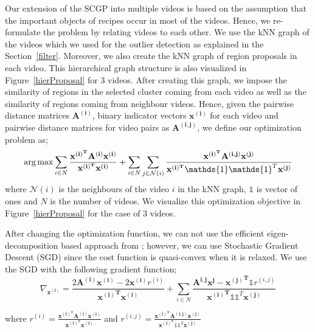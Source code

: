 Our extension of the SCGP into multiple videos is based on the assumption that the important objects of recipes occur in most of the videos. Hence, we re-formulate the problem by relating videos to each other. We use the kNN graph of the videos which we used for the outlier detection as explained in the Section~\ref{filter}. Moreover, we also create the kNN graph of region proposals in each video. This hierarchical graph structure is also visualized in Figure~\ref{hierProposal} for 3 videos. After creating this graph, we impose the similarity of regions in the selected cluster coming from each video as well as the similarity of regions coming from neighbour videos. Hence, given the pairwise distance matrices $\mathbf{A^{(i)}}$, binary indicator vectors $\mathbf{x^{(i)}}$ for each video and pairwise distance matrices for video pairs as $\mathbf{A^{(i,j)}}$, we define our optimization problem as;
\begin{equation}
\argmax \sum_{i \in N} \frac{\mathbf{x^{(i)^T}}\mathbf{A^{(i)}}\mathbf{x^{(i)}}}{\mathbf{x^{(i)^T}}\mathbf{x^{(i)}}} +
\sum_{i \in N} \sum_{j \in \mathcal{N}(i)} \frac{\mathbf{x^{(i)^T}}\mathbf{A^{(i,j)}}\mathbf{x^{(j)}}} {\mathbf{x^{(i)^T}}\mathds{1}\mathds{1}^T\mathbf{x^{(j)}}}
\end{equation}
where $\mathcal{N}(i)$ is the neighbours of the video $i$ in the kNN graph, $\mathds{1}$ is vector of ones and $N$ is the number of videos. We visualize this optimization objective in Figure~\ref{hierProposal} for the case of 3 videos.

After changing the optimization function, we can not use the efficient eigen-decomposition based approach from \cite{scgp,scgp_eigen}; however, we can use Stochastic Gradient Descent (SGD) since the cost function is quasi-convex when it is relaxed. We use the SGD with the following gradient function;
\begin{equation}
  \nabla_{\mathbf{x^{(i)}}} = \frac{2\mathbf{A^{(i)}} \mathbf{x^{(i)}} -2\mathbf{x^{(i)}} r^{(i)}}
  {\mathbf{{x^{(i)}}^T}\mathbf{x^{(i)}}}
+ \sum_{i \in N} \frac{\mathbf{A^{i,j}}\mathbf{x^{j}} - \mathbf{{x^{(j)}}^T} \mathds{1} r^{(i,j)}}{\mathbf{{x^{(i)}}^T} \mathds{1} \mathds{1}^T \mathbf{x^{(j)}} }
\end{equation}

where $r^{(i)}=\frac{\mathbf{x^{(i)^T}}\mathbf{A^{(i)}}\mathbf{x^{(i)}}}{\mathbf{x^{(i)^T}}\mathbf{x^{(i)}}}$ and $r^{(i,j)}=\frac{\mathbf{x^{(i)^T}}\mathbf{A^{(i,j)}}\mathbf{x^{(j)}}} {\mathbf{x^{(i)^T}}\mathds{1}\mathds{1}^T\mathbf{x^{(j)}}}$

